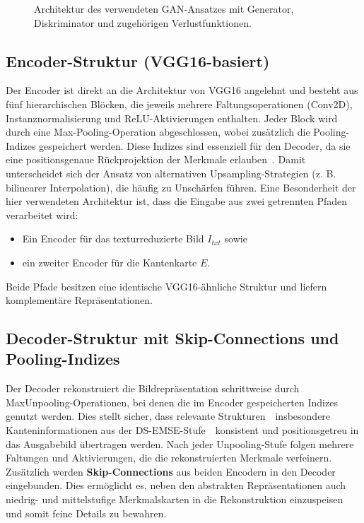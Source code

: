 {\begin{figure}[htpb]
    \centering
    
    \caption{Architektur des verwendeten GAN-Ansatzes mit Generator, Diskriminator und zugehörigen Verlustfunktionen.}
    \label{fig:GANArchitektur}
\end{figure}




\subsection{Encoder-Struktur (VGG16-basiert)}
Der Encoder ist direkt an die Architektur von VGG16 angelehnt und besteht aus fünf hierarchischen Blöcken, die jeweils mehrere Faltungsoperationen (Conv2D), Instanznormalisierung und \ac{ReLU}-Aktivierungen enthalten. 
Jeder Block wird durch eine Max-Pooling-Operation abgeschlossen, wobei zusätzlich die Pooling-Indizes gespeichert werden. 
Diese Indizes sind essenziell für den Decoder, da sie eine positionsgenaue Rückprojektion der Merkmale erlauben~\cite{friedrich2025kiProduktion}. 
Damit unterscheidet sich der Ansatz von alternativen Upsampling-Strategien (z. B. bilinearer Interpolation), die häufig zu Unschärfen führen. 
Eine Besonderheit der hier verwendeten Architektur ist, dass die Eingabe aus zwei getrennten Pfaden verarbeitet wird:
\begin{itemize}
    \item Ein Encoder für das texturreduzierte Bild $I_{txt}$ sowie
    \item ein zweiter Encoder für die Kantenkarte $E$.
\end{itemize}
Beide Pfade besitzen eine identische VGG16-ähnliche Struktur und liefern komplementäre Repräsentationen.




\subsection{Decoder-Struktur mit Skip-Connections und Pooling-Indizes}
Der Decoder rekonstruiert die Bildrepräsentation schrittweise durch MaxUnpooling-Operationen, bei denen die im Encoder gespeicherten Indizes genutzt werden. 
Dies stellt sicher, dass relevante Strukturen~\textendash~insbesondere Kanteninformationen aus der \ac{DS-EMSE}-Stufe~\textendash~konsistent und positionsgetreu in das Ausgabebild übertragen werden. 
Nach jeder Unpooling-Stufe folgen mehrere Faltungen und Aktivierungen, die die rekonstruierten Merkmale verfeinern. 
Zusätzlich werden \textbf{Skip-Connections} aus beiden Encodern in den Decoder eingebunden. 
Dies ermöglicht es, neben den abstrakten Repräsentationen auch niedrig- und mittelstufige Merkmalskarten in die Rekonstruktion einzuspeisen und somit feine Details zu bewahren.




}
